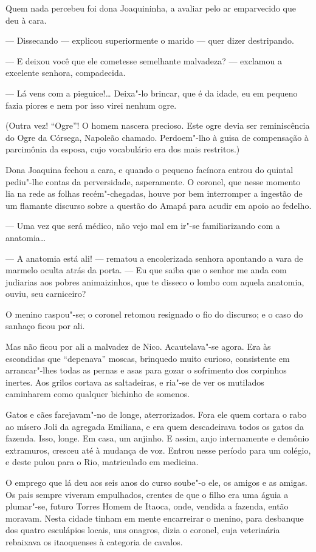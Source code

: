 Quem nada percebeu foi dona Joaquininha, a avaliar pelo ar emparvecido
que deu à cara.

--- Dissecando --- explicou superiormente o marido --- quer dizer
destripando.

--- E deixou você que ele cometesse semelhante malvadeza? --- exclamou a
excelente senhora, compadecida.

--- Lá vens com a pieguice!\ldots{} Deixa"-lo brincar, que é da idade, eu em
pequeno fazia piores e nem por isso virei nenhum ogre.

(Outra vez! ``Ogre''! O homem nascera precioso. Este ogre devia ser
reminiscência do Ogre da Córsega, Napoleão chamado. Perdoem"-lho à guisa
de compensação à parcimônia da esposa, cujo vocabulário era dos mais
restritos.)

Dona Joaquina fechou a cara, e quando o pequeno facínora entrou do
quintal pediu"-lhe contas da perversidade, asperamente. O coronel, que
nesse momento lia na rede as folhas recém"-chegadas, houve por bem
interromper a ingestão de um flamante discurso sobre a questão do Amapá
para acudir em apoio ao fedelho.

--- Uma vez que será médico, não vejo mal em ir"-se familiarizando com a
anatomia\ldots{}

--- A anatomia está ali! --- rematou a encolerizada senhora apontando a
vara de marmelo oculta atrás da porta. --- Eu que saiba que o senhor me
anda com judiarias aos pobres animaizinhos, que te disseco o lombo com
aquela anatomia, ouviu, seu carniceiro?

O menino raspou"-se; o coronel retomou resignado o fio do discurso; e o
caso do sanhaço ficou por ali.

Mas não ficou por ali a malvadez de Nico. Acautelava"-se agora. Era às
escondidas que ``depenava'' moscas, brinquedo muito curioso, consistente
em arrancar"-lhes todas as pernas e asas para gozar o sofrimento dos
corpinhos inertes. Aos grilos cortava as saltadeiras, e ria"-se de ver os
mutilados caminharem como qualquer bichinho de somenos.

Gatos e cães farejavam"-no de longe, aterrorizados. Fora ele quem cortara
o rabo ao mísero Joli da agregada Emiliana, e era quem descadeirava
todos os gatos da fazenda. Isso, longe. Em casa, um anjinho. E assim,
anjo internamente e demônio extramuros, cresceu até à mudança de voz.
Entrou nesse período para um colégio, e deste pulou para o Rio,
matriculado em medicina.

O emprego que lá deu aos seis anos do curso soube"-o ele, os amigos e as
amigas. Os pais sempre viveram empulhados, crentes de que o filho era
uma águia a plumar"-se, futuro Torres Homem de Itaoca, onde, vendida a
fazenda, então moravam. Nesta cidade tinham em mente encarreirar o
menino, para desbanque dos quatro esculápios locais, uns onagros, dizia
o coronel, cuja veterinária rebaixava os itaoquenses à categoria de
cavalos.

